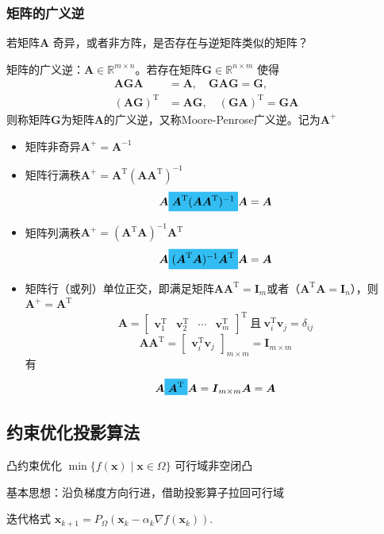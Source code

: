 \subsubsection{矩阵的广义逆}
若矩阵$\boldsymbol{A}$ 奇异，或者非方阵，是否存在与逆矩阵类似的矩阵？
\begin{definition}
    矩阵的广义逆：$\boldsymbol{A}\in\mathbb{R}^{m\times n}$。若存在矩阵$\boldsymbol{G}\in\mathbb{R}^{n\times m}$ 使得
    \[
        \begin{aligned}
            \boldsymbol{AGA}&=\boldsymbol{A},\quad \boldsymbol{GAG}=\boldsymbol{G},\\
            (\boldsymbol{AG})^{\mathrm{T}}&=\boldsymbol{AG},\quad(\boldsymbol{GA})^{\mathrm{T}}=\boldsymbol{GA}
        \end{aligned}
    \]
    则称矩阵$\boldsymbol{G}$为矩阵$\boldsymbol{A}$的广义逆，又称Moore-Penrose广义逆。记为$\boldsymbol{A}^+$
\end{definition}
\begin{itemize}
    \item 矩阵非奇异$\boldsymbol{A}^{+} = \boldsymbol{A}^{-1}$
    \item 矩阵行满秩$\boldsymbol{A}^{+} = \boldsymbol{A}^{\mathrm{T}}(\boldsymbol{A}\boldsymbol{A}^{\mathrm{T}})^{-1}$
    \[
        \boldsymbol{A}\colorbox{cyan!80}{$\boldsymbol{A}^{\mathrm{T}}(\boldsymbol{A}\boldsymbol{A}^{\mathrm{T}})^{-1}$}\boldsymbol{A} = \boldsymbol{A}
    \]
    \item 矩阵列满秩$\boldsymbol{A}^{+} = (\boldsymbol{A}^{\mathrm{T}}\boldsymbol{A})^{-1}\boldsymbol{A}^{\mathrm{T}}$
    \[
        \boldsymbol{A}\colorbox{cyan!80}{$(\boldsymbol{A}^{\mathrm{T}}\boldsymbol{A})^{-1}\boldsymbol{A}^{\mathrm{T}}$}\boldsymbol{A} = \boldsymbol{A}
    \]
    \item 矩阵行（或列）单位正交，即满足矩阵$\boldsymbol{A}\boldsymbol{A}^{\mathrm{T}} = \boldsymbol{I}_{m}$或者（$\boldsymbol{A}^{\mathrm{T}}\boldsymbol{A} = \boldsymbol{I}_{n}$），则$\boldsymbol{A}^+ = \boldsymbol{A}^{\mathrm{T}}$
    \[  
        \boldsymbol{A} = \begin{bmatrix}
            \boldsymbol{v}_{1}^{\mathrm{T}} & \boldsymbol{v}_{2}^{\mathrm{T}} & \cdots & \boldsymbol{v}_m^{\mathrm{T}}
        \end{bmatrix}^{\mathrm{T}}\ \text{且}\ \boldsymbol{v}_{i}^{\mathrm{T}}\boldsymbol{v}_{j} = \delta_{ij}
    \]
    \[
        \boldsymbol{A}\boldsymbol{A}^{\mathrm{T}} = \begin{bmatrix}
            \boldsymbol{v}_{i}^{\mathrm{T}}\boldsymbol{v}_{j}
        \end{bmatrix}_{m\times m} = \boldsymbol{I}_{m\times m}
    \]
    有
    \[
        \boldsymbol{A}\colorbox{cyan!80}{$\boldsymbol{A}^{\mathrm{T}}$}\boldsymbol{A} = \boldsymbol{I}_{m\times m}\boldsymbol{A} = \boldsymbol{A}
    \]
\end{itemize}

\subsection{约束优化投影算法}
凸约束优化 $\min\{f(\boldsymbol{x})\mid \boldsymbol{x}\in\Omega\}$
可行域非空闭凸

基本思想：沿负梯度方向行进，借助投影算子拉回可行域

迭代格式 $\boldsymbol{x}_{k+ 1}= P_{\Omega }( \boldsymbol{x}_{k}- {\alpha } _{k}\nabla f( \boldsymbol{x}_{k}) ) .$